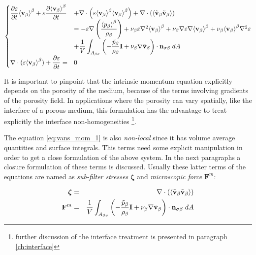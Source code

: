 \begin{eqnarray}
\begin{cases}
 \dfrac{\partial \varepsilon}{\partial t}{\left< \textbf{v}_{\beta} \right>}^{\beta} + \varepsilon \dfrac{\partial {\left< \textbf{v}_{\beta}\right>}^{\beta}}{\partial t} &+ \nabla \cdot \left(\varepsilon {\left< \textbf{v}_{\beta}\right>}^{\beta}{\left< \textbf{v}_{\beta} \right>}^{\beta}\right)   + \nabla \cdot \left({\left< \tilde{\textbf{v}}_{\beta} \tilde{\textbf{v}}_{\beta} \right>}\right)   \\
&= -\varepsilon \nabla \left(\dfrac{{\left< p_{\beta} \right>}^{\beta}}{\rho_{\beta}}\right) + \nu_{\beta} \varepsilon \nabla^2 {\left< \textbf{v}_{\beta} \right>}^{\beta} +  \nu_{\beta} \nabla \varepsilon \nabla {\left< \textbf{v}_{\beta}\right>}^{\beta} + \nu_{\beta} {\left< \textbf{v}_{\beta} \right>}^{\beta} \nabla^2 \varepsilon  \\
&+ \dfrac{1}{V} \displaystyle\int_{A_{\beta \sigma}} \left(-\dfrac{\tilde{p}_{\beta}}{\rho_{\beta}} \mathbf{I}  + \nu_{\beta} \nabla \tilde{\textbf{v}}_{\beta} \right)\cdot \mathbf{n}_{\sigma \beta} \;dA \\
\nabla \cdot (\varepsilon{\left< \textbf{v}_{\beta}\right>}^{\beta} ) + \dfrac{\partial \varepsilon}{\partial t} = &0 
\end{cases}
\label{eq:vans_mom_1}
\end{eqnarray}


It is important to pinpoint that the intrinsic momentum equation explicitly depends on the porosity of the medium, because of the terms involving gradients of the porosity field.
In applications where the porosity can vary spatially, like the interface of a porous medium, this formulation has the advantage to treat explicitly the interface non-homogeneities \footnote{further discussion of the interface treatment is presented in paragraph \ref{ch:interface}}.


The equation \eqref{eq:vans_mom_1} is also \textit{non-local} since it has volume average quantities and surface integrals.
This terms need some explicit manipulation in order to get a close formulation of the above system.
In the next paragraphs a closure formulation of these terms is discussed. Usually these latter terms of the equations are named as \textit{sub-filter stresses} $\boldsymbol{\zeta}$ and \textit{microscopic force} $\mathbf{F}^m$:

\begin{eqnarray}
\boldsymbol{\zeta}&=& \nabla \cdot \left({\left< \tilde{\textbf{v}}_{\beta} \tilde{\textbf{v}}_{\beta} \right>}\right) \nonumber \\
\mathbf{F}^m &=&  \dfrac{1}{V} \int_{A_{\beta \sigma}} \left(-\dfrac{\tilde{p}_{\beta}}{\rho_{\beta}} \mathbf{I}  + \nu_{\beta} \nabla \tilde{\textbf{v}}_{\beta} \right)\cdot \mathbf{n}_{\sigma \beta} \;dA \nonumber
\end{eqnarray}




